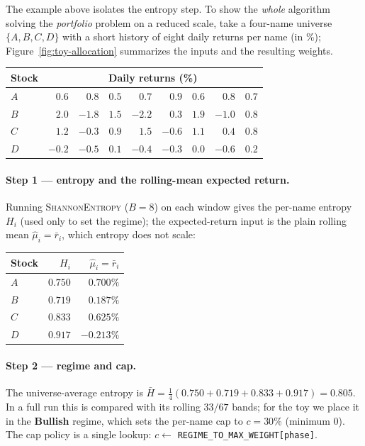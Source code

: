 \documentclass[a4paper,12pt]{article}
\begin{document}
The example above isolates the entropy step. To show the \emph{whole} algorithm solving the \emph{portfolio} problem on a reduced scale, take a four-name universe $\{A,B,C,D\}$ with a short history of eight daily returns per name (in \%); Figure~\ref{fig:toy-allocation} summarizes the inputs and the resulting weights.

\begin{center}
\small
\begin{tabular}{lrrrrrrrr}
\toprule
Stock & \multicolumn{8}{c}{Daily returns (\%)}\\
\midrule
$A$ & $0.6$ & $0.8$ & $0.5$ & $0.7$ & $0.9$ & $0.6$ & $0.8$ & $0.7$\\
$B$ & $2.0$ & $-1.8$ & $1.5$ & $-2.2$ & $0.3$ & $1.9$ & $-1.0$ & $0.8$\\
$C$ & $1.2$ & $-0.3$ & $0.9$ & $1.5$ & $-0.6$ & $1.1$ & $0.4$ & $0.8$\\
$D$ & $-0.2$ & $-0.5$ & $0.1$ & $-0.4$ & $-0.3$ & $0.0$ & $-0.6$ & $0.2$\\
\bottomrule
\end{tabular}
\end{center}

\paragraph{Step 1 --- entropy and the rolling-mean expected return.} Running \textsc{ShannonEntropy} ($B=8$) on each window gives the per-name entropy $H_i$ (used only to set the regime); the expected-return input is the plain rolling mean $\widehat\mu_i=\bar r_i$, which entropy does not scale:

\begin{center}
\small
\begin{tabular}{lrr}
\toprule
Stock & $H_i$ & $\widehat\mu_i=\bar r_i$\\
\midrule
$A$ & $0.750$ & $0.700\%$\\
$B$ & $0.719$ & $0.187\%$\\
$C$ & $0.833$ & $0.625\%$\\
$D$ & $0.917$ & $-0.213\%$\\
\bottomrule
\end{tabular}
\end{center}

\paragraph{Step 2 --- regime and cap.} The universe-average entropy is $\bar H=\tfrac14(0.750+0.719+0.833+0.917)=0.805$. In a full run this is compared with its rolling $33/67$ bands; for the toy we place it in the \textbf{Bullish} regime, which sets the per-name cap to $c=30\%$ (minimum $0$). The cap policy is a single lookup: $c\gets$ \texttt{REGIME\_TO\_MAX\_WEIGHT[phase]}.
\end{document}
